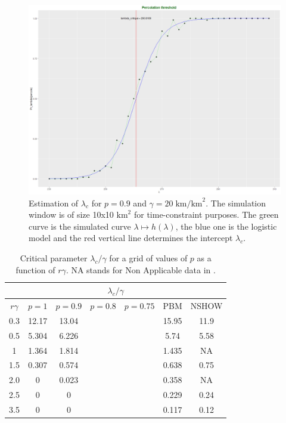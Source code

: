 \documentclass[conference]{IEEEtran}
\begin{document}
\begin{figure}[t!]
\centering
\includegraphics[width=\columnwidth]{Figures/Rplot.png}
\caption{Estimation of $\lambda_{c}$ for $p=0.9$ and $\gamma = 20 \; \text{km/km}^{2}$. The simulation window is of size 10x10 $\text{km}^{2}$ for time-constraint purposes. The green curve is the simulated curve $\lambda \mapsto h(\lambda)$, the blue one is the logistic model and the red vertical line determines the intercept $\lambda_{c}$.}
\label{critical-user-estimation}
\end{figure}
\begin{table}[t!]
\caption{Critical parameter $\lambda_{c}/\gamma$ for a grid of values of $p$ as a function of $r\gamma$. NA stands for Non Applicable data in \cite{cali2018percolation}.} %
\begin{center}
\begin{tabular}{|c|c|c|c|c|c|c|}
\hline
\multicolumn{7}{|c|}{$\lambda_{c}/\gamma$}\\
\hline
$r\gamma$ & $p=1$ & $p=0.9$ & $p=0.8$ & $p=0.75$ & PBM & NSHOW \cite{cali2018percolation} \\
\hline
0.3 & 12.17 & 13.04 &   & & 15.95 & 11.9 \\
0.5 & 5.304  & 6.226 & & & 5.74 & 5.58 \\
1 & 1.364 & 1.814 & & & 1.435 & NA \\
1.5 & 0.307  & 0.574 & &  & 0.638 & 0.75  \\
2.0 & 0  & 0.023 & & & 0.358  & NA \\
2.5 & 0  & 0 & & & 0.229 & 0.24 \\
3.5 & 0 & 0 & & & 0.117 & 0.12 \\
\hline
\end{tabular}
\label{tab-critical-lambda}
\end{center}
\end{table}
\end{document}
